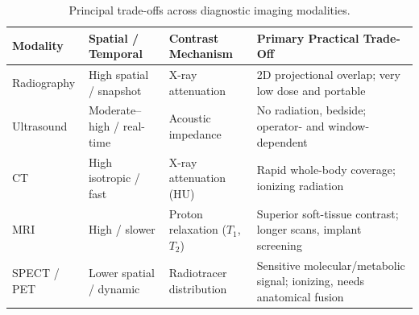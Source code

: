 \begin{table}[ht]
\centering
\caption{Principal trade-offs across diagnostic imaging modalities.}
\label{tab:intro_tradeoffs}
\begin{tabular}{@{}p{}p{}p{}p{}@{}}
\toprule
\textbf{Modality} & \textbf{Spatial / Temporal} & \textbf{Contrast Mechanism} & \textbf{Primary Practical Trade-Off} \\
\midrule
Radiography & High spatial / snapshot & X-ray attenuation & 2D projectional overlap; very low dose and portable \\
Ultrasound & Moderate--high / real-time & Acoustic impedance & No radiation, bedside; operator- and window-dependent \\
CT & High isotropic / fast & X-ray attenuation (HU) & Rapid whole-body coverage; ionizing radiation \\
MRI & High / slower & Proton relaxation ($T_1$, $T_2$) & Superior soft-tissue contrast; longer scans, implant screening \\
SPECT / PET & Lower spatial / dynamic & Radiotracer distribution & Sensitive molecular/metabolic signal; ionizing, needs anatomical fusion \\
\bottomrule
\end{tabular}
\end{table}

